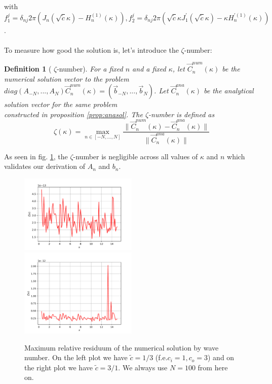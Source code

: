 \documentclass[10pt,journal,compsoc, onecolumn]{IEEEtran}
\newtheorem{definition}[theorem]{Definition}
\begin{document}
with $f_1^j =  \delta_{nj} 2\pi (J_n(\sqrt{\tilde c} \kappa) - H_n^{(1)}(\kappa)), 
f_2^j = \delta_{nj} 2\pi (\sqrt{\tilde c} \kappa J_1^{\prime}(\sqrt{\tilde c}\kappa) - \kappa H_n^{\prime(1)}(\kappa))$.\\
\\
To measure how good the solution is, let's introduce the $\zeta$-number: 
\begin{definition}[ $\zeta$-number]
    For a fixed $n$ and a fixed $\kappa$, let $\vec{C}^{num}_n(\kappa)$ be the numerical solution vector to the problem \\
    $diag(A_{-N}, ..., A_N) \vec{C}^{num}_n(\kappa) = (\vec{b}_{-N}, ... , \vec{b}_{N})$. 
    Let $\vec{C}^{ana}_n(\kappa)$ be the analytical solution vector for the same problem \\
    constructed in proposition \ref{prop:anasol}.
    The $\zeta$-number is defined as 
    $$
        \zeta(\kappa)=  \max\limits_{n \in [-N, ..., N]}\frac{\|\vec{C}^{num}_n(\kappa) - \vec{C}^{ana}_n(\kappa)\|}{\|\vec{C}^{ana}_n(\kappa)\|}
    $$ 
\end{definition}
As seen in fig. \ref{fig:sol_validation}, the $\zeta$-number is negligible across all values of $\kappa$ and $n$ which validates our derivation of $A_n$ and $b_n$.
\begin{figure}
    \label{fig:sol_validation}
    \includegraphics[width=0.5\textwidth]{scenario1SolVal.pdf}
    \includegraphics[width=0.5\textwidth]{scenario2SolVal.pdf}
    \caption{Maximum relative residuum of the numerical solution by wave number. 
    On the left plot we have $\tilde c = 1/3$ (f.e.$c_i = 1, c_o = 3$)
    and on the right plot we have $\tilde c = 3/1$.
    We always use $N = 100$ from here on.}
\end{figure}
\end{document}
